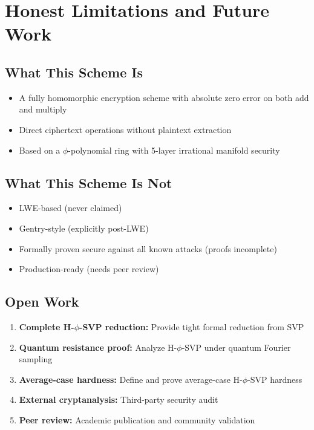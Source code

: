 \documentclass[11pt,a4paper]{article}
\theoremstyle{remark}
\begin{document}
\section{Honest Limitations and Future Work}

\subsection{What This Scheme Is}

\begin{itemize}
    \item A fully homomorphic encryption scheme with absolute zero error on both add and multiply
    \item Direct ciphertext operations without plaintext extraction
    \item Based on a $\phi$-polynomial ring with 5-layer irrational manifold security
\end{itemize}

\subsection{What This Scheme Is Not}

\begin{itemize}
    \item LWE-based (never claimed)
    \item Gentry-style (explicitly post-LWE)
    \item Formally proven secure against all known attacks (proofs incomplete)
    \item Production-ready (needs peer review)
\end{itemize}

\subsection{Open Work}

\begin{enumerate}[label=(\arabic*)]
    \item \textbf{Complete H-$\phi$-SVP reduction:} Provide tight formal reduction from SVP
    \item \textbf{Quantum resistance proof:} Analyze H-$\phi$-SVP under quantum Fourier sampling
    \item \textbf{Average-case hardness:} Define and prove average-case H-$\phi$-SVP hardness
    \item \textbf{External cryptanalysis:} Third-party security audit
    \item \textbf{Peer review:} Academic publication and community validation
\end{enumerate}
\end{document}
